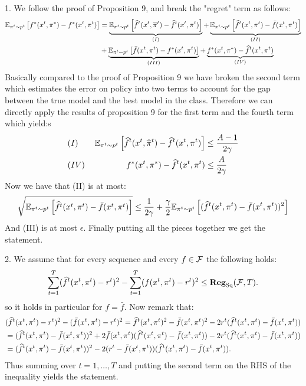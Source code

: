  \begin{solution}[]
    1. We follow the proof of Proposition 9, and break the "regret" term as follows:
    \begin{align*} \EEs{f^*(x^t,\pi^*)-f^*(x^t,\pi^t)}{\pi^t\sim p^t} &= 
        \underbrace{\EEs{\wh f^t(x^t,\wh \pi^t)-\wh f^t(x^t,\pi^t)}{\pi^t \sim p^t}}_{(I)}
    + \underbrace{\EEs{\wh f^t(x^t,\pi^t)-\bar f(x^t,\pi^t)}{\pi^t \sim p^t}}_{(II)}
   \\
    &+ \underbrace{\EEs{\bar f(x^t,\pi^t)- f^*(x^t,\pi^t)}{\pi^t \sim p^t}}_{(III)} +
     \underbrace{f^*(x^t,\pi^*) - \wh f^t(x^t,\pi^t)}_{(IV)}
    \end{align*}
    Basically compared to the proof of Proposition 9 we have broken the second term which estimates the error on policy into two terms to account for the gap between the true model and the best model in the class. 
    Therefore we can directly apply the results of proposition 9 for the first term and the fourth term which yield:s
    \begin{align*}
        (I) \qquad \EEs{\wh f^t(x^t,\wh \pi^t)-\wh f^t(x^t,\pi^t)}{\pi^t \sim p^t} &\leq \frac{A-1}{2\gamma}\\
        (IV)\qquad  \quad \qquad f^*(x^t,\pi^*) - \wh f^t(x^t,\pi^t) &\leq \frac{A}{2\gamma}
    \end{align*}
    Now we have that (II) is at most:
    \begin{align*}
        \sqrt{\EEs{\wh f^t(x^t,\pi^t)-\bar f(x^t,\pi^t)}{\pi^t \sim p^t}} \leq \frac{1}{2\gamma}+\frac{\gamma}{2}\EEs{(\wh f^t(x^t,\pi^t)-\bar f(x^t,\pi^t))^2}{\pi^t\sim p^t}
    \end{align*}
    And (III) is at most $\epsilon$. Finally putting all the pieces together we get the statement.

2. We assume that for every sequence and every $f \in \F$ the following holds:
\[ \sum_{t=1}^T(\wh f^t(x^t,\pi^t)-r^t)^2 -\sum_{t=1}^T(f(x^t,\pi^t)-r^t)^2\leq \Reg_{\text{Sq}}(\F,T).\]
so it holds in particular for $f = \bar f$.
Now remark that:
\begin{align*}
 &(\wh f^t(x^t,\pi^t) - r^t)^2 - (\bar f(x^t,\pi^t)-r^t)^2 = \wh f^t(x^t,\pi^t)^2 - \bar f(x^t,\pi^t)^2 -2r^t(\wh f^t(x^t,\pi^t)-\bar f(x^t,\pi^t)) \\
 &= (\wh f^t(x^t,\pi^t) - \bar f(x^t,\pi^t))^2 + 2\bar f(x^t,\pi^t)(\wh f^t(x^t,\pi^t)-\bar f(x^t,\pi^t))-2r^t(\wh f^t(x^t,\pi^t)-\bar f(x^t,\pi^t)) \\
&=(\wh f^t(x^t,\pi^t) - \bar f(x^t,\pi^t))^2  -2(r^t - \bar f(x^t,\pi^t))(\wh f^t(x^t,\pi^t)-\bar f(x^t,\pi^t)).
\end{align*}
Thus summing over $t=1,\ldots,T$ and putting the second term on the RHS of the inequality yields the statement.


\end{solution}
